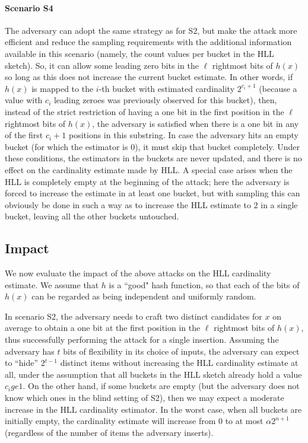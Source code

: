 \documentclass{IEEEtran}
\begin{document}
\noindent\paragraph{Scenario S4} The adversary can adopt the same strategy as for S2, but make the attack more efficient and reduce the sampling requirements with the additional information available in this scenario (namely, the count values per bucket in the HLL sketch). So, it can allow some leading zero bits in the $\ell$ rightmost bits of $h(x)$ so long as this does not increase the current bucket estimate. In other words, if $h(x)$ is mapped to the $i$-th bucket with estimated cardinality $2^{c_i + 1}$ (because a value with $c_i$ leading zeroes was previously observed for this bucket), then, instead of the strict restriction of having a one bit in the first position in the $\ell$ rightmost bits of $h(x)$, the adversary is satisfied when there is a one bit in any of the first $c_i+1$ positions in this substring. In case the adversary hits an empty bucket (for which the estimator is 0), it must skip that bucket completely. Under these conditions, the estimators in the buckets are never updated, and there is no effect on the cardinality estimate made by HLL.  A special case arises when the HLL is completely empty at the beginning of the attack; here the adversary is forced to increase the estimate in at least one bucket, but with sampling this can obviously be done in such a way as to increase the HLL estimate to $2$ in a single bucket, leaving all the other buckets untouched.

\subsection{Impact}
We now evaluate the impact of the above attacks on the HLL cardinality estimate. We assume that $h$ is a ``good" hash function, so that each of the bits of $h(x)$ can be regarded as being independent and uniformly random.

In scenario S2, the adversary needs to craft two distinct candidates for $x$ on average to obtain a one bit at the first position in the $\ell$ rightmost bits of $h(x)$, thus successfully performing the attack for a single insertion. Assuming the adversary has $t$ bits of flexibility in its choice of inputs, the adversary can expect to ``hide''  2$^{t-1}$ distinct items without increasing the HLL cardinality estimate at all, under the assumption that all buckets in the HLL sketch already hold a value $c_i ge 1$. On the other hand, if some buckets are empty (but the adversary does not know which ones in the blind setting of S2), then we may expect a moderate increase in the HLL cardinality estimator. In the worst case, when all buckets are initially empty, the cardinality estimate will increase from 0 to at most $\alpha2^{n+1}$ (regardless of the number of items the adversary inserts).
\end{document}
